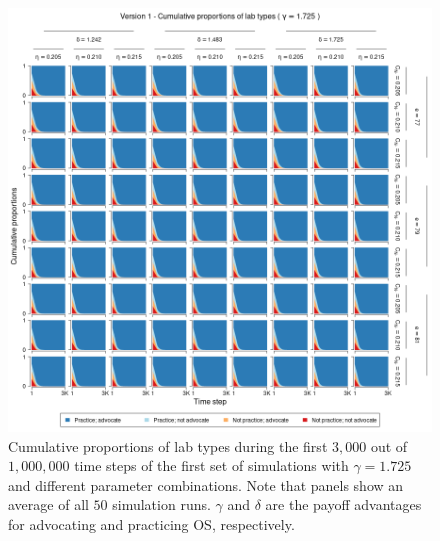 \documentclass[meta, authordate,issue]{jote-new-article}
\begin{document}
\begin{figure}
  \begin{fullwidth}
    \centering
    \includegraphics[width=\textwidth]{v1_pro_plot_sens_payypro1.725.png}
    \caption{Cumulative proportions of lab types during the first $3,000$ out of $1,000,000$ time steps of the first set of simulations with $\gamma=1.725$ and different parameter combinations. Note that panels show an average of all $50$ simulation runs. $\gamma$ and $\delta$ are the payoff advantages for advocating and practicing OS, respectively.}
    \label{fig:v1_pro_plot_sens_payypro1.725}
  \end{fullwidth}
\end{figure}
%
%
\end{document}

